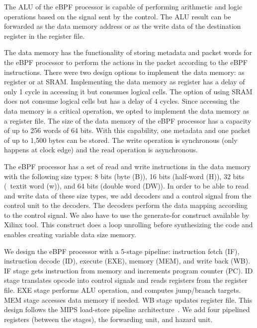 %


The ALU of the eBPF processor is capable of performing arithmetic and logic operations based on the signal sent by the control. The ALU result can be forwarded as the data memory address or as the write data of the destination register in the register file.

The data memory has the functionality of storing metadata and packet words for the eBPF processor to perform the actions in the packet according to the eBPF instructions. There were two design options to implement the data memory: as register or at SRAM. Implementing the data memory as register has a delay of only 1 cycle in accessing it but consumes logical cells. The option of using SRAM does not consume logical cells but has a delay of 4 cycles. Since accessing the data memory is a critical operation, we opted to implement the data memory as a register file. The size of the data memory of the eBPF processor has a capacity of up to 256 words of 64 bits. With this capability, one metadata and one packet of up to 1,500 bytes can be stored. 
The write operation is synchronous (only happens at clock edge) and the read operation is asynchronous.

The eBPF processor has a set of read and write instructions in the data memory with the following size types: 8 bits (byte (B)), 16 bits (half-word (H)), 32 bits (\ textit {word} (w)), and 64 bits (double word (DW)). In order to be able to read and write data of these size types, 
we add decoders and a control signal from the control unit to the decoders. The decoders perform the data mapping according to the control signal.
We also have to use the generate-for construct available by Xilinx tool. 
This construct does a loop unrolling before synthesizing the code and enables creating variable data size memory.

We design the eBPF processor with a 5-stage pipeline: instruction fetch (IF), instruction decode (ID), execute (EXE), memory (MEM), and write back (WB).
IF stage gets instruction from memory and increments program counter (PC).
ID stage translates opcode into control signals and reads registers from the register file. EXE stage performs ALU operation, and computes jump/branch targets. MEM stage accesses data memory if needed. WB stage updates register file. 
This design follows the MIPS load-store pipeline architecture~\cite{Hennessy:2011:CAF:1999263}.
We add four pipelined registers (between the stages), the forwarding unit, and hazard unit. 

